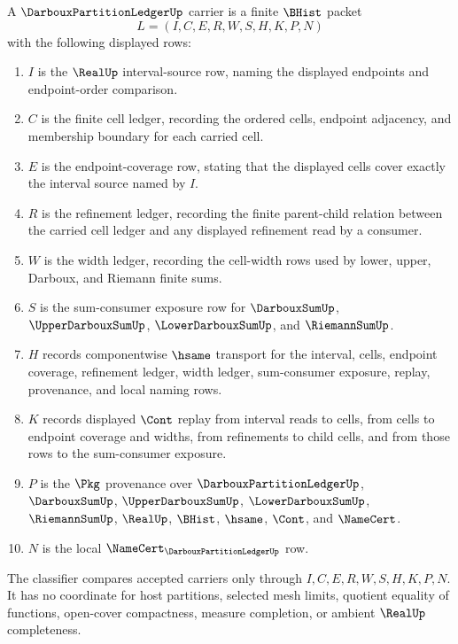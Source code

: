 \begin{definition}
\label{def:darboux-partition-ledger-carrier}
A $\DarbouxPartitionLedgerUp$ carrier is a finite $\BHist$ packet
$$
L=(I,C,E,R,W,S,H,K,P,N)
$$
with the following displayed rows:
\begin{enumerate}
\item $I$ is the $\RealUp$ interval-source row, naming the displayed endpoints and endpoint-order comparison.
\item $C$ is the finite cell ledger, recording the ordered cells, endpoint adjacency, and membership boundary for each carried cell.
\item $E$ is the endpoint-coverage row, stating that the displayed cells cover exactly the interval source named by $I$.
\item $R$ is the refinement ledger, recording the finite parent-child relation between the carried cell ledger and any displayed refinement read by a consumer.
\item $W$ is the width ledger, recording the cell-width rows used by lower, upper, Darboux, and Riemann finite sums.
\item $S$ is the sum-consumer exposure row for $\DarbouxSumUp$, $\UpperDarbouxSumUp$, $\LowerDarbouxSumUp$, and $\RiemannSumUp$.
\item $H$ records componentwise $\hsame$ transport for the interval, cells, endpoint coverage, refinement ledger, width ledger, sum-consumer exposure, replay, provenance, and local naming rows.
\item $K$ records displayed $\Cont$ replay from interval reads to cells, from cells to endpoint coverage and widths, from refinements to child cells, and from those rows to the sum-consumer exposure.
\item $P$ is the $\Pkg$ provenance over $\DarbouxPartitionLedgerUp$, $\DarbouxSumUp$, $\UpperDarbouxSumUp$, $\LowerDarbouxSumUp$, $\RiemannSumUp$, $\RealUp$, $\BHist$, $\hsame$, $\Cont$, and $\NameCert$.
\item $N$ is the local $\NameCert_{\DarbouxPartitionLedgerUp}$ row.
\end{enumerate}
The classifier compares accepted carriers only through $I,C,E,R,W,S,H,K,P,N$. It has no coordinate for host partitions, selected mesh limits, quotient equality of functions, open-cover compactness, measure completion, or ambient $\RealUp$ completeness.
\end{definition}

